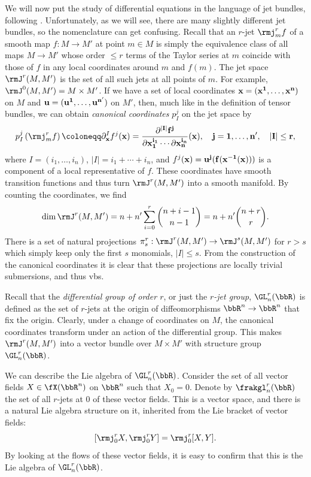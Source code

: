 We will now put the study of differential equations in the language of jet bundles, following \cite[\S3.2]{Kras}. Unfortunately, as we will see, there are many slightly different jet bundles, so the nomenclature can get confusing. Recall that an $r$-jet $\rmj^r_m f$ of a smooth map $f:M\to M'$ at point $m\in M$ is simply the equivalence class of all maps $M\to M'$ whose order $\leq r$ terms of the Taylor series  at $m$ coincide with those of $f$ in any local coordinates around $m$ and $f(m)$. The jet space $\rmJ^r(M,M')$ is the set of all such jets at all points of $m$. For example, $\rmJ^0(M,M')=M\times M'$. If we have a set of local coordinates $\bf{x}=(x^1,\ldots,x^n)$ on $M$ and $\bf{u}=(u^1,\ldots,u^{n'})$ on $M'$, then, much like in the definition of tensor bundles, we can obtain \emph{canonical coordinates} $p^j_I$ on the jet space by 
\[p^j_I\left(\rmj^r_mf\right)\coloneqq \partial^I_{\bf{x}}f^j(\bf{x})=\frac{\partial^{|I|}f^j}{\partial x_1^{i_1}\cdots\partial x_n^{i_n}}(\bf{x}),\quad j=1,\ldots,n',\quad |I|\leq r,\] 
where $I=(i_1,\ldots,i_n)$, $|I|=i_1+\cdots+i_n$, and $f^j(\bf{x})=u^j(f(\bf{x}^{-1}(\bf{x})))$ is a component of a local representative of $f$. These coordinates have smooth transition functions and thus turn $\rmJ^r(M,M')$ into a smooth manifold. By counting the coordinates, we find 
\[\dim \rmJ^r (M,M')=n+n'\sum_{i=0}^r\binom{n+i-1}{n-1}=n+n'\binom{n+r}{r}.\]
There is a set of natural projections $\pi^r_{s}:\rmJ^r(M,M')\to \rmJ^s(M,M')$ for $r>s$ which simply keep only the first $s$ monomials, $|I|\leq s$. From the construction of the canonical coordinates it is clear that these projections are locally trivial submersions, and thus \glspl{vb}.

Recall that the \emph{differential group of order $r$}, or just the \emph{$r$-jet group},  $\GL_n^r(\bbR)$ is defined as the set of $r$-jets at the origin of diffeomorphisms $\bbR^n\to \bbR^n$ that fix the origin. Clearly, under a change of coordinates on $M$, the canonical coordinates transform under an action of the differential group. This makes $\rmJ^r(M,M')$ into a vector bundle over $M\times M'$ with structure group $\GL_n^r(\bbR)$. 

We can describe the Lie algebra of $\GL^r_n(\bbR)$. Consider the set of all vector fields $X\in\fX(\bbR^n)$ on $\bbR^n$ such that $X_0=0$. Denote by $\frakgl^r_n(\bbR)$ the set of all $r$-jets at $0$ of these vector fields. This is a vector space, and there is a natural Lie algebra structure on it, inherited from the Lie bracket of vector fields:
\[[\rmj_0^r X,\rmj_0^r Y]=\rmj^r_0[X,Y].\]
By looking at the flows of these vector fields, it is easy to confirm that this is the Lie algebra of $\GL^r_n(\bbR)$.

